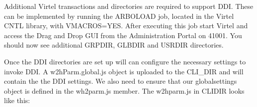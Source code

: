\documentclass[letterpaper,10pt,english]{sphinxmanual}
\begin{document}
\begin{sphinxVerbatim}[commandchars=\\\{\}]
       
   
    
       
   
    
\end{sphinxVerbatim}

\sphinxAtStartPar
{}

\ignorespaces 
\sphinxAtStartPar
Additional Virtel transactions and directories are required to support DDI. These can be implemented by running the ARBOLOAD job, located in the Virtel CNTL library, with VMACROS=YES. After executing this job start Virtel and access the Drag and Drop GUI from the Administration Portal on 41001. You should now see additional GRP\sphinxhyphen{}DIR, GLB\sphinxhyphen{}DIR and USR\sphinxhyphen{}DIR directories.

\sphinxAtStartPar
{}

\sphinxAtStartPar
{}

\ignorespaces 
\sphinxAtStartPar
Once the DDI directories are set up will can configure the necessary settings to invoke DDI. A w2hParm.global.js object is uploaded to the CLI\_DIR and will contain the the DDI settings. We also need to ensure that our global\sphinxhyphen{}settings object is defined in the wh2parm.js member. The w2hparm.js in CLI\sphinxhyphen{}DIR looks like this:
\end{document}
